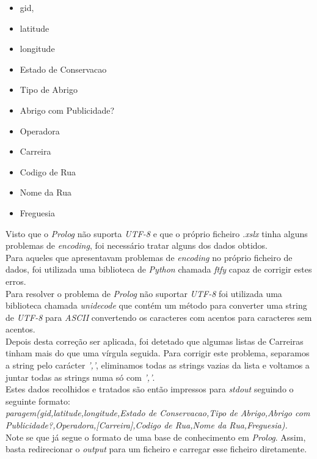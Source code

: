 \documentclass[a4paper]{report}
\begin{document}
\begin{itemize}
            \item gid,
            \item latitude
            \item longitude
            \item Estado de Conservacao
            \item Tipo de Abrigo
            \item Abrigo com Publicidade?
            \item Operadora
            \item Carreira
            \item Codigo de Rua
            \item Nome da Rua
            \item Freguesia
\end{itemize}
Visto que o \textit{Prolog} não suporta \textit{UTF-8} e que o próprio ficheiro
\textit{.xslx} tinha alguns problemas de \textit{encoding}, foi necessário
tratar alguns dos dados obtidos.\\
Para aqueles que apresentavam problemas de \textit{encoding} no próprio ficheiro de
dados, foi utilizada uma biblioteca de \textit{Python} chamada \textit{ftfy}
capaz de corrigir estes erros.\\
Para resolver o problema de \textit{Prolog} não suportar \textit{UTF-8} foi
utilizada uma biblioteca chamada \textit{unidecode} que contém um método para
converter uma string de \textit{UTF-8} para \textit{ASCII} convertendo os
caracteres com acentos para caracteres sem acentos.\\
Depois desta correção ser aplicada, foi detetado que algumas listas de Carreiras
tinham mais do que uma vírgula seguida. Para corrigir este problema, separamos a
string pelo carácter \textit{','}, eliminamos todas as strings vazias da lista e
voltamos a juntar todas as strings numa só com \textit{','}.\\
Estes dados recolhidos e tratados são então impressos para \textit{stdout}
seguindo o seguinte formato:\\
\textit{paragem(gid,latitude,longitude,Estado de Conservacao,Tipo de
Abrigo,Abrigo com Publicidade?,Operadora,[Carreira],Codigo de Rua,Nome da
Rua,Freguesia).}\\
Note se que já segue o formato de uma base de conhecimento em \textit{Prolog}.
Assim, basta redirecionar o \textit{output} para um ficheiro e carregar esse
ficheiro diretamente.\\
\end{document}
